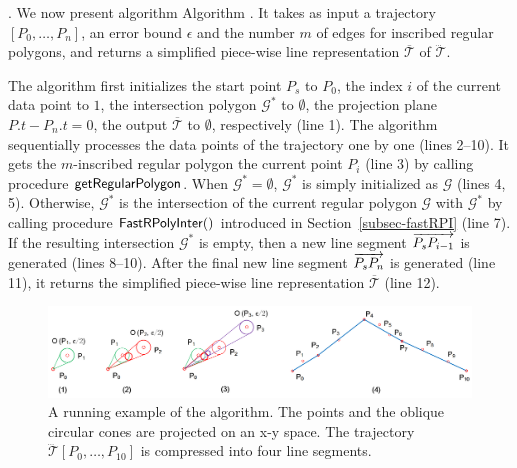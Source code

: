 . We now present algorithm Algorithm \cist. It takes as input a trajectory ${[P_0, \ldots, P_n]}$, an error bound $\epsilon$ and the number $m$ of edges for inscribed regular polygons, and returns a simplified  piece-wise line representation $\overline{\mathcal{T}}$ of $\dddot{\mathcal{T}}$.



The algorithm first initializes the start point $P_s$ to $P_0$, the index $i$ of the current data point to $1$, the intersection polygon $\mathcal{G}^*$ to $\emptyset$, the projection plane $P.t - P_n.t = 0$, the output $\overline{\mathcal{T}}$ to $\emptyset$, respectively (line 1).
%
The algorithm sequentially processes the data points of the trajectory one by one  (lines 2--10). It gets the $m$-inscribed regular polygon \wrt the current point $P_i$ (line 3) by calling procedure ${\mathsf{getRegularPolygon}}$. When $\mathcal{G}^* = \emptyset$, $\mathcal{G}^*$ is simply initialized as $\mathcal{G}$ (lines 4, 5). Otherwise,
$\mathcal{G}^*$ is  the intersection of the current regular polygon $\mathcal{G}$ with $\mathcal{G}^*$ by calling procedure ${\mathsf{FastRPolyInter}}()$ introduced in Section~\ref{subsec-fastRPI} (line 7). If the resulting intersection $\mathcal{G}^*$ is empty, then a new line segment $\protect\overrightarrow{P_sP_{i-1}}$ is generated (lines 8--10).
After the  final new line segment $\protect\overrightarrow{P_sP_{n}}$ is generated (line 11), it returns the simplified  piece-wise line representation $\overline{\mathcal{T}}$ (line 12).




\begin{figure}[tb!]
\centering
\includegraphics[scale=0.8]{figures/Fig-ex-conest.png}
\vspace{-2ex}
\caption{\small A running example of the \cist algorithm. The points and the oblique circular cones are projected on an x-y space. The trajectory $\dddot{\mathcal{T}}[P_0, \ldots, P_{10}]$ is compressed into four line segments.}
\vspace{-3ex}
\label{fig:exm-const}
\end{figure}




